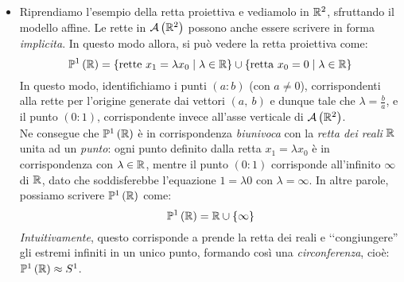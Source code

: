 \begin{examples}
\begin{itemize}
\begin{enumerate}
	\end{enumerate}
	\item Riprendiamo l'esempio della retta proiettiva e vediamolo in $\mathbb{R}^2$, sfruttando il modello affine. Le rette in ${\mathcal{A}\left(\mathbb{R}^2\right)}$ possono anche essere scrivere in forma \textit{implicita}. In questo modo allora, si può vedere la retta proiettiva come:
	\begin{equation*}
		\proj[1]{\realset}=\left\{\text{rette } x_1=\lambda x_0\mid \lambda\in\realset\right\}\cup \left\{\text{retta } x_0=0\mid \lambda\in\realset\right\}
	\end{equation*}
	In questo modo, identifichiamo i punti $\left(a\colon b\right)$ (con $a\neq 0$), corrispondenti alla rette per l'origine generate dai vettori $\left(a,\ b\right)$ e dunque tale che $\lambda=\frac{b}{a}$, e il punto $\left(0\colon 1\right)$, corrispondente invece all'asse verticale di ${\mathcal{A}\left(\mathbb{R}^2\right)}$.\\ Ne consegue che $\proj[1]{\realset}$ è in corrispondenza \textit{biunivoca} con la \textit{retta dei reali} $\mathbb{R}$ unita ad un \textit{punto}: ogni punto definito dalla retta $x_1=\lambda x_0$ è in corrispondenza con $\lambda\in\mathbb{R}$, mentre il punto $\left(0\colon 1\right)$ corrisponde all'infinito $\infty$ di $\mathbb{R}$, dato che soddisferebbe l'equazione $1=\lambda 0$ con $\lambda=\infty$. In altre parole, possiamo scrivere $\proj[1]{\realset}$ come:
	\begin{equation*}
		\proj[1]{\realset}=\realset\cup\left\{\infty\right\}
	\end{equation*}
    \textit{Intuitivamente}, questo corrisponde a prende la retta dei reali e ‘‘congiungere'' gli estremi infiniti in un unico punto, formando così una \textit{circonferenza}, cioè: $\proj[1]{\realset}\approx S^1$.
	\end{itemize}
\end{examples}
